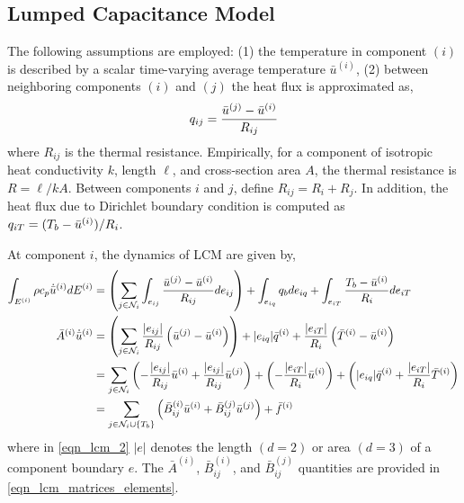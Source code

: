 \subsection{Lumped Capacitance Model}

The following assumptions are employed: (1) the temperature in component $(i)$ is described by a scalar time-varying average temperature $\bar{u}^{(i)}$, (2) between neighboring components $(i)$ and $(j)$ the heat flux is approximated as,
\begin{equation}
    q_{ij} = \frac{\bar{u}^{(j)} - \bar{u}^{(i)}}{R_{ij}}
\end{equation}
where $R_{ij}$ is the thermal resistance. Empirically, for a component of isotropic heat conductivity $k$, length $\ell$, and cross-section area $A$, the thermal resistance is $R=\ell/kA$. Between components $i$ and $j$, define $R_{ij}=R_{i} + R_{j}$. In addition, the heat flux due to Dirichlet boundary condition is computed as $q_{iT} = (T_b - \bar{u}^{(i)})/R_{i}$.

At component $i$, the dynamics of LCM are given by,
\begin{subequations}
    \begin{align}
        \int_{E^{(i)}}\rho c_p \dot{\bar{u}}^{(i)} dE^{(i)} &= \left(\sum_{j\in\mathcal{N}_i}\int_{e_{ij}}\frac{\bar{u}^{(j)} - \bar{u}^{(i)}}{R_{ij}}de_{ij}\right) + \int_{e_{iq}} q_b de_{iq} + \int_{e_{iT}}\frac{T_b - \bar{u}^{(i)}}{R_i}de_{iT}\label{eqn_lcm_1}\\
        \bar{A}^{(i)}\dot{\bar{u}}^{(i)} &= \left(\sum_{j\in\mathcal{N}_i}\frac{|e_{ij}|}{R_{ij}}\left(\bar{u}^{(j)} - \bar{u}^{(i)}\right)\right) + |e_{iq}|\bar{q}^{(i)} + \frac{|e_{iT}|}{R_i}\left(\bar{T}^{(i)} - \bar{u}^{(i)}\right) \label{eqn_lcm_2}\\ 
        &= \sum_{j\in\mathcal{N}_i}\left(-\frac{|e_{ij}|}{R_{ij}}\bar{u}^{(i)} + \frac{|e_{ij}|}{R_{ij}}\bar{u}^{(j)}\right) + \left(-\frac{|e_{iT}|}{R_{i}}\bar{u}^{(i)}\right) + \left(|e_{iq}|\bar{q}^{(i)} + \frac{|e_{iT}|}{R_i}\bar{T}^{(i)}\right)\label{eqn_lcm_3}\\
        &= \sum_{j\in\mathcal{N}_i\cup\left\{T_b\right\}}\left(\bar{B}^{(i)}_{ij}\bar{u}^{(i)} + \bar{B}^{(j)}_{ij}\bar{u}^{(j)}\right) + \bar{f}^{(i)}\label{eqn_lcm_4}
    \end{align}
\end{subequations}
where in \cref{eqn_lcm_2} $|e|$ denotes the length $(d=2)$ or area $(d=3)$ of a component boundary $e$. The $\bar{A}^{(i)}$, $\bar{B}_{ij}^{(i)}$, and $\bar{B}_{ij}^{(j)}$ quantities are provided in \cref{eqn_lcm_matrices_elements}.

